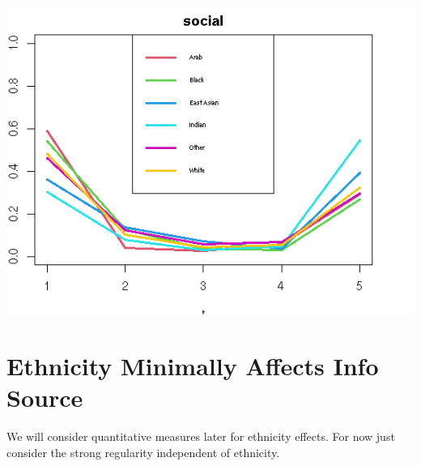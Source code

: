 \documentclass{amsart}
\begin{document}
\includegraphics[scale=0.4]{infosoc.png}

\section{Ethnicity Minimally Affects Info Source}

We will consider quantitative measures later for ethnicity effects.  For now just consider the strong regularity independent of ethnicity.
\end{document}
